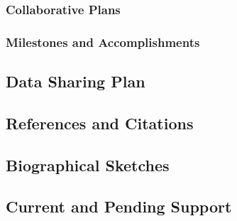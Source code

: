 \documentclass[palatinofont10]{nsfprop}
\begin{document}
\subsubsection{Collaborative Plans}
\subsubsection{Milestones and Accomplishments}

\vspace{-1ex}
\subsection{Data Sharing Plan}

\clearpage
\subsection{References and Citations}
\setcounter{page}{1}


\clearpage
\subsection{Biographical Sketches}
\setcounter{page}{1}

\clearpage

\clearpage


\clearpage
\vspace{-1ex}
\subsection{Current and Pending Support}
\setcounter{page}{1}

\clearpage

\clearpage

\end{document}
